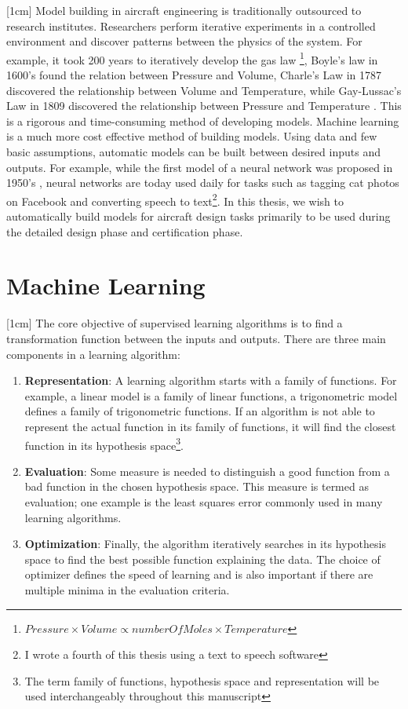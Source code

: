 [1cm]
Model building in aircraft engineering is traditionally outsourced to research institutes. Researchers perform iterative experiments in a controlled environment and discover patterns between the physics of the system. For example, it took 200 years to iteratively develop the gas law \footnote{$Pressure \times Volume \propto numberOfMoles \times Temperature$}, Boyle's law in 1600's found the relation between Pressure and Volume, Charle's Law in 1787 discovered the relationship between Volume and Temperature, while Gay-Lussac's Law in 1809 discovered the relationship between Pressure and Temperature \cite{clapeyron1834memoire}. This is a rigorous and time-consuming method of developing models. Machine learning is a much more cost effective  method of building models. Using data and few basic assumptions, automatic models can be built between desired inputs and outputs. For example, while the first model of a neural network was proposed in 1950's \cite{mcculloch1943logical, rosenblatt1958perceptron}, neural networks are today used daily for tasks such as tagging cat photos on Facebook and converting speech to text\footnote{I wrote a fourth of this thesis using a text to speech software}. In this thesis, we wish to automatically build models for aircraft design tasks primarily to be used during the detailed design phase and certification phase. 


\section{Machine Learning}\label{secMachineLearning}
[1cm]
The core objective of supervised learning algorithms is to find a transformation function between the inputs and outputs. There are three main components in a learning algorithm:
\begin{enumerate}
\item \textbf{Representation}: A learning algorithm starts with a family of functions. For example, a linear model is a family of linear functions, a trigonometric model defines a family of trigonometric functions. If an algorithm is not able to represent the actual function in its family of functions, it will find the closest function in its hypothesis space\footnote{The term family of functions, hypothesis space and representation will be used interchangeably throughout this manuscript}.
\item \textbf{Evaluation}: Some measure is needed to distinguish a good function from a bad function in the chosen hypothesis space. This measure is termed as evaluation; one example is the least squares error commonly used in many learning algorithms. 
\item \textbf{Optimization}: Finally, the algorithm iteratively searches in its hypothesis space to find the best possible function explaining the data. The choice of optimizer defines the speed of learning and is also important if there are multiple minima in the evaluation criteria.
\end{enumerate}

